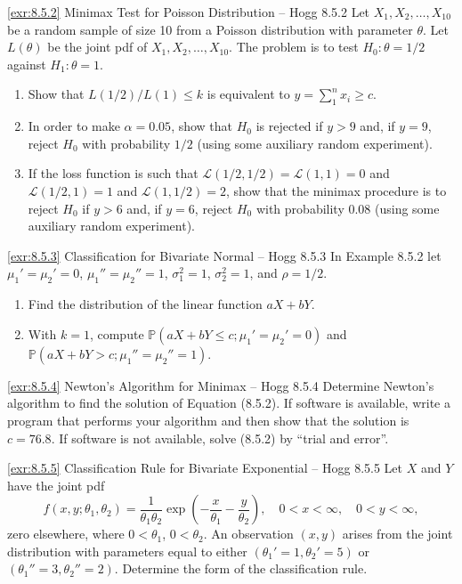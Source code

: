 \begin{exercise}{\ref{exr:8.5.2} Minimax Test for Poisson Distribution -- Hogg 8.5.2}\label{exr:8.5.2}
Let $X_1, X_2, \ldots, X_{10}$ be a random sample of size 10 from a Poisson distribution with parameter $\theta$. Let $L(\theta)$ be the joint pdf of $X_1, X_2, \ldots, X_{10}$. The problem is to test $H_0: \theta = 1/2$ against $H_1: \theta = 1$.
\begin{enumerate}
\item[(a)] Show that $L(1/2)/L(1) \leq k$ is equivalent to $y = \sum_{1}^n x_i \geq c$.
\item[(b)] In order to make $\alpha = 0.05$, show that $H_0$ is rejected if $y > 9$ and, if $y = 9$, reject $H_0$ with probability $1/2$ (using some auxiliary random experiment).
\item[(c)] If the loss function is such that $\mathcal{L}(1/2,1/2) = \mathcal{L}(1,1) = 0$ and $\mathcal{L}(1/2,1) = 1$ and $\mathcal{L}(1,1/2) = 2$, show that the minimax procedure is to reject $H_0$ if $y > 6$ and, if $y = 6$, reject $H_0$ with probability 0.08 (using some auxiliary random experiment).
\end{enumerate}
\end{exercise}

\begin{exercise}{\ref{exr:8.5.3} Classification for Bivariate Normal -- Hogg 8.5.3}\label{exr:8.5.3}
In Example 8.5.2 let $\mu_1' = \mu_2' = 0$, $\mu_1'' = \mu_2'' = 1$, $\sigma_1^2 = 1$, $\sigma_2^2 = 1$, and $\rho = 1/2$.
\begin{enumerate}
\item[(a)] Find the distribution of the linear function $aX + bY$.
\item[(b)] With $k = 1$, compute $\mathbb{P}(aX + bY \leq c; \mu_1' = \mu_2' = 0)$ and $\mathbb{P}(aX + bY > c; \mu_1'' = \mu_2'' = 1)$.
\end{enumerate}
\end{exercise}

\begin{exercise}{\ref{exr:8.5.4} Newton's Algorithm for Minimax -- Hogg 8.5.4}\label{exr:8.5.4}
Determine Newton's algorithm to find the solution of Equation (8.5.2). If software is available, write a program that performs your algorithm and then show that the solution is $c = 76.8$. If software is not available, solve (8.5.2) by ``trial and error''.
\end{exercise}

\begin{exercise}{\ref{exr:8.5.5} Classification Rule for Bivariate Exponential -- Hogg 8.5.5}\label{exr:8.5.5}
Let $X$ and $Y$ have the joint pdf
\[
f(x, y; \theta_1, \theta_2) = \frac{1}{\theta_1\theta_2}\exp\left(-\frac{x}{\theta_1} - \frac{y}{\theta_2}\right), \quad 0 < x < \infty, \quad 0 < y < \infty,
\]
zero elsewhere, where $0 < \theta_1$, $0 < \theta_2$. An observation $(x, y)$ arises from the joint distribution with parameters equal to either $(\theta_1' = 1, \theta_2' = 5)$ or $(\theta_1'' = 3, \theta_2'' = 2)$. Determine the form of the classification rule.
\end{exercise}

